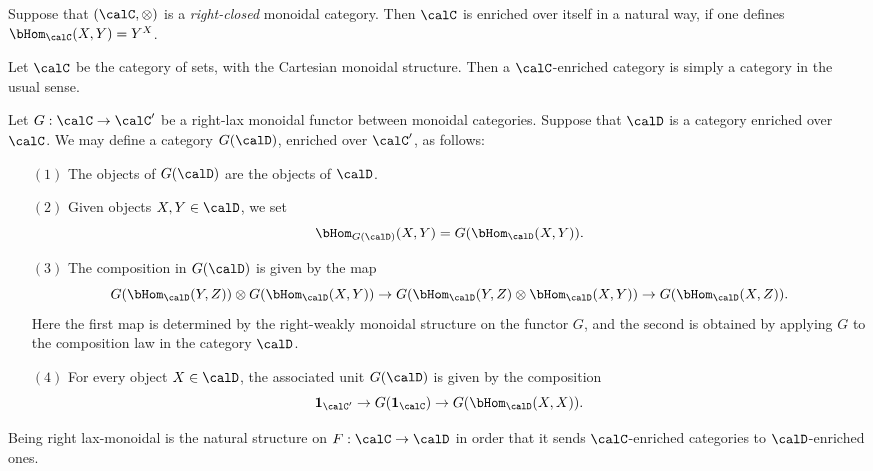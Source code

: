 \begin{CategoryTheory}
\begin{example}
Suppose that $(\calC, \otimes)$ is a {\em right-closed} monoidal category. Then $\calC$ is enriched over itself in a natural way, if one defines $\bHom_{\calC}(X,Y) = Y^{X}$.
\end{example}

\begin{example}
Let $\calC$ be the category of sets, with the Cartesian monoidal structure. Then a $\calC$-enriched category is simply a category in the usual sense. 
\end{example}

\begin{remark}\label{laxcon}
Let $G: \calC \rightarrow \calC'$ be a right-lax monoidal functor between monoidal categories.
Suppose that $\calD$ is a category enriched over $\calC$. We may define a category
$G(\calD)$, enriched over $\calC'$, as follows:

\begin{itemize}
\item[$(1)$] The objects of $G(\calD)$ are the objects of $\calD$.
\item[$(2)$] Given objects $X,Y \in \calD$, we set $$\bHom_{G(\calD)}(X,Y) = G( \bHom_{\calD}(X,Y) ).$$
\item[$(3)$] The composition in $G(\calD)$ is given by the map
$$ G( \bHom_{\calD}(Y,Z) ) \otimes G( \bHom_{\calD}(X,Y) ) \rightarrow
G( \bHom_{\calD}(Y,Z) \otimes \bHom_{\calD}(X,Y) ) \rightarrow G( \bHom_{\calD}(X,Z)).$$
Here the first map is determined by the right-weakly monoidal structure on the functor $G$, and the second is obtained by applying $G$ to the composition law in the category $\calD$.
\item[$(4)$] For every object $X \in \calD$, the associated unit $G(\calD)$ is given by the composition
$$ {\bf 1_{\calC'} } \rightarrow G( { \bf 1_{\calC} } ) \rightarrow G( \bHom_{\calD}(X,X)).$$
\end{itemize}
\end{remark}
\begin{shaded}
Being right lax-monoidal is the natural structure on $F:\calC\to\calD$ in order that it sends $\calC$-enriched categories to $\calD$-enriched ones.
\end{shaded}


\end{CategoryTheory}
